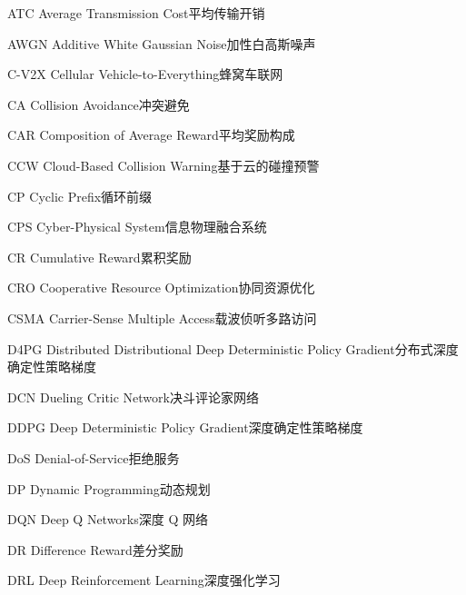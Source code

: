 \begin{abbreviate}[0mm][18mm]
\item[ATC] Average Transmission Cost\hspace{1em}平均传输开销
\item[AWGN] Additive White Gaussian Noise\hspace{1em}加性白高斯噪声
\item[C-V2X] Cellular Vehicle-to-Everything\hspace{1em}蜂窝车联网
\item[CA] Collision Avoidance\hspace{1em}冲突避免
\item[CAR] Composition of Average Reward\hspace{1em}平均奖励构成
\item[CCW] Cloud-Based Collision Warning\hspace{1em}基于云的碰撞预警
\item[CP] Cyclic Prefix\hspace{1em}循环前缀
\item[CPS] Cyber-Physical System\hspace{1em}信息物理融合系统
\item[CR] Cumulative Reward\hspace{1em}累积奖励
\item[CRO] Cooperative Resource Optimization\hspace{1em}协同资源优化
\item[CSMA] Carrier-Sense Multiple Access\hspace{1em}载波侦听多路访问
\item[D4PG] Distributed Distributional Deep Deterministic Policy Gradient\hspace{1em}分布式深度确定性策略梯度
\item[DCN] Dueling Critic Network\hspace{1em}决斗评论家网络
\item[DDPG] Deep Deterministic Policy Gradient\hspace{1em}深度确定性策略梯度
\item[DoS] Denial-of-Service\hspace{1em}拒绝服务
\item[DP] Dynamic Programming\hspace{1em}动态规划
\item[DQN] Deep Q Networks\hspace{1em}深度 Q 网络
\item[DR] Difference Reward\hspace{1em}差分奖励
\item[DRL] Deep Reinforcement Learning\hspace{1em}深度强化学习

\end{abbreviate}
